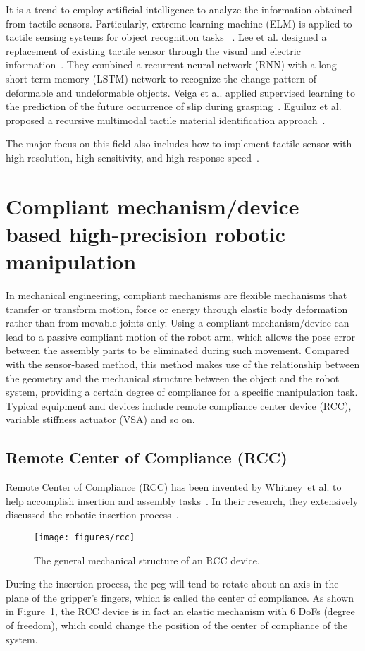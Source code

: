\documentclass[journal,twoside,web]{ieeecolor}
\begin{document}
It is a trend to employ artificial intelligence to analyze the information obtained from tactile sensors.
Particularly, extreme learning machine (ELM) is applied to tactile sensing systems for object recognition tasks ~\cite{Liu2017,Zhang2018,Liu2019}.
Lee et al. designed a replacement of existing tactile sensor through the visual and electric information~\cite{Lee2018}. They combined a recurrent neural network (RNN) with a long short-term memory (LSTM) network to recognize the change pattern of deformable and undeformable objects.
Veiga et al. applied supervised learning to the prediction of the future occurrence of slip during grasping~\cite{Veiga2018}.
Eguiluz et al. proposed a recursive multimodal tactile material identification approach~\cite{Eguiluz2018}.

The major focus on this field also includes how to implement tactile sensor with high resolution, high sensitivity, and high response speed~\cite{Yin2018,Patel2018,Boutry2018,Hughes2018,Zhang2018}.

\section{Compliant mechanism/device based high-precision robotic manipulation}
\label{sec:compliant_dev}

In mechanical engineering, compliant mechanisms are flexible mechanisms that transfer or transform motion, force or energy through elastic body deformation rather than from movable joints only.
Using a compliant mechanism/device can lead to a passive compliant motion of the robot arm, which allows the pose error between the assembly parts to be eliminated during such movement.
Compared with the sensor-based method, this method makes use of the relationship between the geometry and the mechanical structure between the object and the robot system, providing a certain degree of compliance for a specific manipulation task. 
Typical equipment and devices include remote compliance center device (RCC), variable stiffness actuator (VSA) and so on.

\subsection{Remote Center of Compliance (RCC)}
\label{subsec:rcc}

Remote Center of Compliance (RCC) has been invented by Whitney~et al. to help accomplish insertion and assembly tasks~\cite{Whitney1986a}. 
In their research, they extensively discussed the robotic insertion process~\cite{Whitney1987}.
\begin{figure}[htb]
    \centering
    \texttt{[image: figures/rcc]}
    \caption{The general mechanical structure of an RCC device.}
    \label{fig:rcc}
\end{figure}
During the insertion process, the peg will tend to rotate about an axis in the plane of the gripper's fingers, which is called the center of compliance. 
As shown in Figure~\ref{fig:rcc}, the RCC device is in fact an elastic mechanism with 6 DoFs (degree of freedom), which could change the position of the center of compliance of the system.
\end{document}

